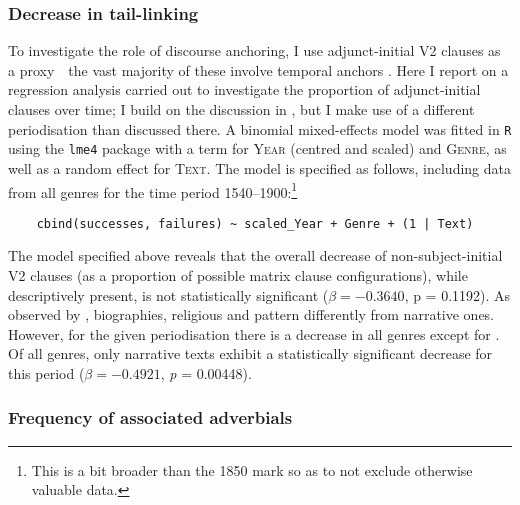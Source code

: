 \documentclass[output=paper,colorlinks,citecolor=brown]{langscibook}
\begin{document}
\subsubsection{Decrease in tail-linking}\label{sec:5.2.3}

To investigate the role of discourse anchoring, I use adjunct-initial V2 clauses as a proxy\ \textendash{}\ the vast majority of these involve temporal anchors \citep{booth-beck20200jhs}. Here I report on a regression analysis carried out to investigate the proportion of adjunct-initial clauses over time; I build on the discussion in \citet[35]{booth-beck20200jhs}, but I make use of a different periodisation than discussed there. A binomial mixed-effects model was fitted in \texttt{R} \citep{rcoreteam} using the \texttt{lme4} package \citep{lme4} with a term for \textsc{Year} (centred and scaled) and \textsc{Genre}, as well as a random effect for \textsc{Text}. The model is specified as follows, including data from all genres for the time period 1540--1900:\footnote{This is a bit broader than the 1850 mark so as to not exclude otherwise valuable data.} 

\ea
\begin{verbatim}
    cbind(successes, failures) ~ scaled_Year + Genre + (1 | Text) \end{verbatim} 
    \z

The model specified above reveals that the overall decrease of non-subject-initial V2 clauses (as a proportion of possible matrix clause configurations), while descriptively present, is not statistically significant (\(\beta = -0.3640\), p = 0.1192). As observed by \citet{booth-beck20200jhs}, biographies, religious and  pattern differently from narrative ones. However, for the given periodisation there is a decrease in all genres except for . Of all genres, only narrative texts exhibit a statistically significant decrease for this period (\(\beta = -0.4921\), \textit{p} = 0.00448).

\subsubsection{Frequency of associated adverbials}\label{sec:Chark5.2.4}
\end{document}
